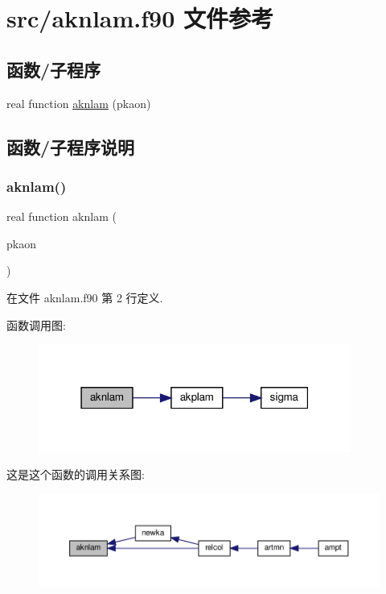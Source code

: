 \hypertarget{aknlam_8f90}{}\section{src/aknlam.f90 文件参考}
\label{aknlam_8f90}
\subsection*{函数/子程序}
\begin{DoxyCompactItemize}
\item 
real function \mbox{\hyperlink{aknlam_8f90_a101dc4784ee90d6c049f5ca5a76b6bb8}{aknlam}} (pkaon)
\end{DoxyCompactItemize}


\subsection{函数/子程序说明}
\mbox{\label{aknlam_8f90_a101dc4784ee90d6c049f5ca5a76b6bb8}} 
\subsubsection{\texorpdfstring{aknlam()}{aknlam()}}
{\footnotesize\ttfamily real function aknlam (\begin{DoxyParamCaption}\item[{}]{pkaon }\end{DoxyParamCaption})}



在文件 aknlam.\+f90 第 2 行定义.

函数调用图\+:
\nopagebreak
\begin{figure}[H]
\begin{center}
\leavevmode
\includegraphics[width=291pt]{aknlam_8f90_a101dc4784ee90d6c049f5ca5a76b6bb8_cgraph}
\end{center}
\end{figure}
这是这个函数的调用关系图\+:
\nopagebreak
\begin{figure}[H]
\begin{center}
\leavevmode
\includegraphics[width=350pt]{aknlam_8f90_a101dc4784ee90d6c049f5ca5a76b6bb8_icgraph}
\end{center}
\end{figure}
